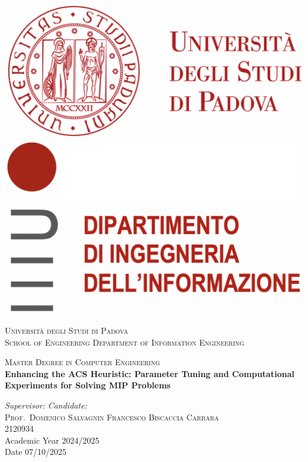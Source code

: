 \documentclass[a4paper,12pt]{report}
\begin{document}
\begin{titlepage}
\begin{center}

\includegraphics[height=0.13\textheight]{logo_unipd.png}
\hfill
\includegraphics[height=0.13\textheight]{logo_dei.png}
\newline
\newline

\vspace{0.8cm}
\textsc{\LARGE Universit\`{a} degli Studi di Padova}\\
\vspace{1.6cm}
\textsc{\large School of Engineering Department of Information Engineering}\\
\vspace{0.4cm}

\textsc{\large Master Degree in Computer Engineering}\\
\vfill
{ \LARGE \bfseries Enhancing the ACS Heuristic: Parameter Tuning and Computational Experiments for Solving MIP Problems}\\
\vfill

\textit{\large Supervisor:} \hfill \textit{\large Candidate:}\\
\textsc{\large Prof.\ Domenico Salvagnin} \hfill \textsc{Francesco Biscaccia Carrara}\\
\textit{\large {}} \hfill \textsc{2120934}\\

\vfill
{\large Academic Year 2024/2025}\\
{Date 07/10/2025} 
\end{center}
\end{titlepage}
\end{document}
